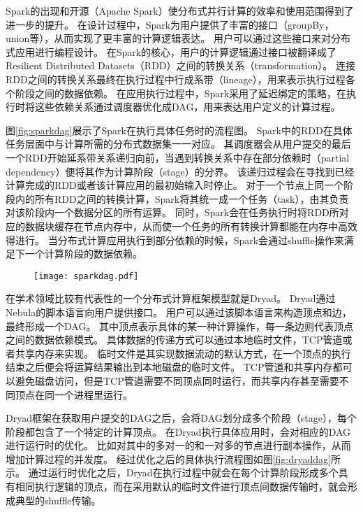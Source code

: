 Spark\cite{spark}的出现和开源（Apache Spark\cite{apachespark}）使分布式并行计算的效率和使用范围得到了进一步的提升。
在设计过程中，Spark为用户提供了丰富的接口（groupBy，union等），从而实现了更丰富的计算逻辑表达。
用户可以通过这些接口来对分布式应用进行编程设计。
在Spark的核心，用户的计算逻辑通过接口被翻译成了Resilient Distributed Datasets（RDD）之间的转换关系（transformation）。
连接RDD之间的转换关系最终在执行过程中行成系带（lineage），用来表示执行过程各个阶段之间的数据依赖。
在应用执行过程中，Spark采用了延迟绑定的策略，在执行时将这些依赖关系通过调度器优化成DAG，用来表达用户定义的计算过程。

图\ref{fig:sparkdag}展示了Spark在执行具体任务时的流程图。
Spark中的RDD在具体任务层面中与计算所需的分布式数据集一一对应。
其调度器会从用户提交的最后一个RDD开始延系带关系递归向前，当遇到转换关系中存在部分依赖时（partial dependency）便将其作为计算阶段（stage）的分界。
该递归过程会在寻找到已经计算完成的RDD或者该计算应用的最初始输入时停止。
对于一个节点上同一个阶段内的所有RDD之间的转换计算，Spark将其统一成一个任务（task），由其负责对该阶段内一个数据分区的所有运算。
同时，Spark会在任务执行时将RDD所对应的数据块缓存在节点内存中，从而使一个任务的所有转换计算都能在内存中高效得进行。
当分布式计算应用执行到部分依赖的时候，Spark会通过shuffle操作来满足下一个计算阶段的数据依赖。

\begin{figure}[!htp]
    \centering
    \texttt{[image: sparkdag.pdf]}
\end{figure}

在学术领域比较有代表性的一个分布式计算框架模型就是Dryad\cite{dryad}。
Dryad通过Nebula的脚本语言向用户提供接口。
用户可以通过该脚本语言来构造顶点和边，最终形成一个DAG。
其中顶点表示具体的某一种计算操作，每一条边则代表顶点之间的数据依赖模式。
具体数据的传递方式可以通过本地临时文件，TCP管道或者共享内存来实现。
临时文件是其实现数据流动的默认方式，在一个顶点的执行结束之后便会将运算结果输出到本地磁盘的临时文件。
TCP管道和共享内存都可以避免磁盘访问，但是TCP管道需要不同顶点同时运行，而共享内存甚至需要不同顶点在同一个进程里运行。

Dryad框架在获取用户提交的DAG之后，会将DAG划分成多个阶段（stage），每个阶段都包含了一个特定的计算顶点。
在Dryad执行具体应用时，会对相应的DAG进行运行时的优化。
比如对其中的多对一的和一对多的节点进行副本操作，从而增加计算过程的并发度。
经过优化之后的具体执行流程图如图\ref{fig:dryaddag}所示。
通过运行时优化之后，Dryad在执行过程中就会在每个计算阶段形成多个具有相同执行逻辑的顶点，而在采用默认的临时文件进行顶点间数据传输时，就会形成典型的shuffle传输。

